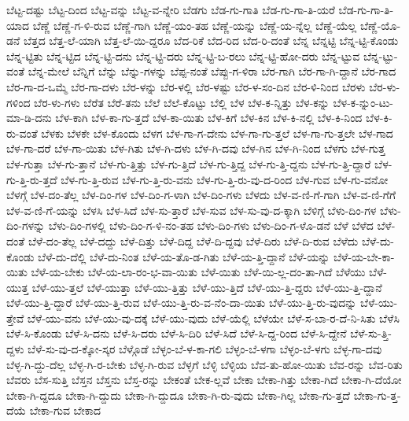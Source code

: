{ಬೆಟ್ಟ-ದಷ್ಟು
ಬೆಟ್ಟ-ದಿಂದ
ಬೆಟ್ಟ-ವನ್ನು
ಬೆಟ್ಟ-ವ-ನ್ನೇರಿ
ಬೆಡಗು
ಬೆಡ-ಗು-ಗಾತಿ
ಬೆಡ-ಗು-ಗಾ-ತಿ-ಯರೆ
ಬೆಡ-ಗು-ಗಾ-ತಿ-ಯಾದ
ಬೆಣ್ಣೆ
ಬೆಣ್ಣೆ-ಗ-ಳಿ-ರುವ
ಬೆಣ್ಣೆ-ಗಾಗಿ
ಬೆಣ್ಣೆ-ಯಂ-ತಹ
ಬೆಣ್ಣೆ-ಯನ್ನು
ಬೆಣ್ಣೆ-ಯ-ನ್ನೆಲ್ಲ
ಬೆಣ್ಣೆ-ಯೆಲ್ಲ
ಬೆಣ್ಣೆ-ಯೊ-ಡನೆ
ಬೆತ್ತದ
ಬೆತ್ತ-ಲೆ-ಯಾಗಿ
ಬೆತ್ತ-ಲೆ-ಯಿ-ದ್ದರೂ
ಬೆದ-ರಿಕೆ
ಬೆದ-ರಿದ
ಬೆದ-ರಿ-ದಂತೆ
ಬೆನ್ನ
ಬೆನ್ನಟ್ಟಿ
ಬೆನ್ನ-ಟ್ಟಿ-ಕೊಂಡು
ಬೆನ್ನ-ಟ್ಟಿತು
ಬೆನ್ನ-ಟ್ಟಿದ
ಬೆನ್ನ-ಟ್ಟಿ-ದನು
ಬೆನ್ನ-ಟ್ಟಿ-ದರು
ಬೆನ್ನ-ಟ್ಟಿ-ಬ-ರಲು
ಬೆನ್ನ-ಟ್ಟಿ-ಹೋ-ದರು
ಬೆನ್ನ-ಟ್ಟುವ
ಬೆನ್ನ-ಟ್ಟು-ವಂತೆ
ಬೆನ್ನ-ಮೇಲೆ
ಬೆನ್ನಿಗೆ
ಬೆನ್ನು
ಬೆನ್ನು-ಗಳನ್ನು
ಬೆಪ್ಪ-ನಂತೆ
ಬೆಪ್ಪು-ಗ-ಳಿರಾ
ಬೆರ-ಗಾಗಿ
ಬೆರ-ಗಾ-ಗಿ-ದ್ದಾನೆ
ಬೆರ-ಗಾದ
ಬೆರ-ಗಾ-ದ-ಒಮ್ಮೆ
ಬೆರ-ಗಾ-ದಳು
ಬೆರ-ಳನ್ನು
ಬೆರ-ಳಲ್ಲಿ
ಬೆರ-ಳಷ್ಟು
ಬೆರ-ಳ-ಸಂ-ದಿನ
ಬೆರ-ಳಿ-ನಿಂದ
ಬೆರಳು
ಬೆರ-ಳು-ಗಳಿಂದ
ಬೆರ-ಳು-ಗಳು
ಬೆರೆತ
ಬೆರೆ-ತನು
ಬೆಲೆ
ಬೆಲೆ-ಕೊಟ್ಟು
ಬೆಲ್ಲಿ
ಬೆಳ
ಬೆಳ-ಕ-ನ್ನಿತ್ತು
ಬೆಳ-ಕನ್ನು
ಬೆಳ-ಕ-ನ್ನುಂ-ಟು-ಮಾ-ಡಿ-ದನು
ಬೆಳ-ಕಾಗಿ
ಬೆಳ-ಕಾ-ಗು-ತ್ತದೆ
ಬೆಳ-ಕಾ-ಯಿತು
ಬೆಳ-ಕಿಗೆ
ಬೆಳ-ಕಿನ
ಬೆಳ-ಕಿ-ನಲ್ಲಿ
ಬೆಳ-ಕಿ-ನಿಂದ
ಬೆಳ-ಕಿ-ರು-ವಂತೆ
ಬೆಳಕು
ಬೆಳಕೇ
ಬೆಳ-ಕೊಂದು
ಬೆಳಗ
ಬೆಳ-ಗಾ-ಗ-ದೇನು
ಬೆಳ-ಗಾ-ಗು-ತ್ತಲೆ
ಬೆಳ-ಗಾ-ಗು-ತ್ತಲೇ
ಬೆಳ-ಗಾದ
ಬೆಳ-ಗಾ-ದರೆ
ಬೆಳ-ಗಾ-ಯಿತು
ಬೆಳ-ಗಿತು
ಬೆಳ-ಗಿ-ದಳು
ಬೆಳ-ಗಿ-ದವು
ಬೆಳ-ಗಿನ
ಬೆಳ-ಗಿ-ನಿಂದ
ಬೆಳಗು
ಬೆಳ-ಗುತ್ತ
ಬೆಳ-ಗುತ್ತಾ
ಬೆಳ-ಗು-ತ್ತಾನೆ
ಬೆಳ-ಗು-ತ್ತಿತ್ತು
ಬೆಳ-ಗು-ತ್ತಿದೆ
ಬೆಳ-ಗು-ತ್ತಿದ್ದ
ಬೆಳ-ಗು-ತ್ತಿ-ದ್ದನು
ಬೆಳ-ಗು-ತ್ತಿ-ದ್ದಾರೆ
ಬೆಳ-ಗು-ತ್ತಿ-ರು-ತ್ತದೆ
ಬೆಳ-ಗು-ತ್ತಿ-ರುವ
ಬೆಳ-ಗು-ತ್ತಿ-ರು-ವನು
ಬೆಳ-ಗು-ತ್ತಿ-ರು-ವು-ದ-ರಿಂದ
ಬೆಳ-ಗುವ
ಬೆಳ-ಗು-ವನೋ
ಬೆಳಗ್ಗೆ
ಬೆಳ-ದಂ-ತೆಲ್ಲ
ಬೆಳ-ದಿಂ-ಗಳ
ಬೆಳ-ದಿಂ-ಗ-ಳಾಗಿ
ಬೆಳ-ದಿಂ-ಗಳು
ಬೆಳದು
ಬೆಳ-ವ-ಣಿ-ಗೆ-ಗಾಗಿ
ಬೆಳ-ವ-ಣಿ-ಗೆಗೆ
ಬೆಳ-ವ-ಣಿ-ಗೆ-ಯನ್ನು
ಬೆಳಸಿ
ಬೆಳ-ಸಿದೆ
ಬೆಳ-ಸು-ತ್ತಾರೆ
ಬೆಳ-ಸುವ
ಬೆಳ-ಸು-ವು-ದ-ಕ್ಕಾಗಿ
ಬೆಳಿಗ್ಗೆ
ಬೆಳು-ದಿಂ-ಗಳ
ಬೆಳು-ದಿಂ-ಗಳನ್ನು
ಬೆಳು-ದಿಂ-ಗಳಲ್ಲಿ
ಬೆಳು-ದಿಂ-ಗ-ಳಿ-ನಂ-ತಹ
ಬೆಳು-ದಿಂ-ಗಳು
ಬೆಳು-ದಿಂ-ಗ-ಳೊ-ಡನೆ
ಬೆಳೆ
ಬೆಳೆದ
ಬೆಳೆ-ದಂತೆ
ಬೆಳೆ-ದಂ-ತೆಲ್ಲ
ಬೆಳೆ-ದದ್ದು
ಬೆಳೆ-ದಿತ್ತು
ಬೆಳೆ-ದಿದ್ದ
ಬೆಳೆ-ದಿ-ದ್ದವು
ಬೆಳೆ-ದಿರು
ಬೆಳೆ-ದಿ-ರುವ
ಬೆಳೆದು
ಬೆಳೆ-ದು-ಕೊಂಡು
ಬೆಳೆ-ದು-ದೆಲ್ಲಿ
ಬೆಳೆ-ದು-ನಿಂತ
ಬೆಳೆ-ಯ-ತೊ-ಡ-ಗಿತು
ಬೆಳೆ-ಯ-ತ್ತಿ-ದ್ದಾನೆ
ಬೆಳೆ-ಯನ್ನು
ಬೆಳೆ-ಯ-ಬೇ-ಕಾ-ಯಿತು
ಬೆಳೆ-ಯ-ಬೇಕು
ಬೆಳೆ-ಯ-ಲಾ-ರಂ-ಭ-ವಾ-ಯಿತು
ಬೆಳೆ-ಯಿತು
ಬೆಳೆ-ಯಿ-ಲ್ಲ-ದಂ-ತಾ-ಗಿದೆ
ಬೆಳೆಯು
ಬೆಳೆ-ಯುತ್ತ
ಬೆಳೆ-ಯು-ತ್ತಲೆ
ಬೆಳೆ-ಯುತ್ತಾ
ಬೆಳೆ-ಯು-ತ್ತಿತ್ತು
ಬೆಳೆ-ಯು-ತ್ತಿದೆ
ಬೆಳೆ-ಯು-ತ್ತಿ-ದ್ದರು
ಬೆಳೆ-ಯು-ತ್ತಿ-ದ್ದಾನೆ
ಬೆಳೆ-ಯು-ತ್ತಿ-ದ್ದಾರೆ
ಬೆಳೆ-ಯು-ತ್ತಿ-ರುವ
ಬೆಳೆ-ಯು-ತ್ತಿ-ರು-ವ-ನೆಂ-ದಾ-ಯಿತು
ಬೆಳೆ-ಯು-ತ್ತಿ-ರು-ವುದನ್ನು
ಬೆಳೆ-ಯು-ತ್ತೇವೆ
ಬೆಳೆ-ಯು-ವನು
ಬೆಳೆ-ಯು-ವು-ದಕ್ಕೆ
ಬೆಳೆ-ಯು-ವುದು
ಬೆಳೆ-ಯೆಲ್ಲಿ
ಬೆಳೆಯೇ
ಬೆಳೆ-ಸ-ಬಾ-ರ-ದೆ-ನಿ-ಸಿತು
ಬೆಳೆಸಿ
ಬೆಳೆ-ಸಿ-ಕೊಂಡು
ಬೆಳೆ-ಸಿ-ದನು
ಬೆಳೆ-ಸಿ-ದರು
ಬೆಳೆ-ಸಿ-ದಿರಿ
ಬೆಳೆ-ಸಿದೆ
ಬೆಳೆ-ಸಿ-ದ್ದ-ರಿಂದ
ಬೆಳೆ-ಸಿ-ದ್ದೇನೆ
ಬೆಳೆ-ಸು-ತ್ತಿ-ದ್ದಳು
ಬೆಳೆ-ಸು-ವು-ದ-ಕ್ಕೋ-ಸ್ಕರ
ಬೆಳ್ಗೊಡೆ
ಬೆಳ್ಳಂ-ಬೆ-ಳ-ಕಾ-ಗಲಿ
ಬೆಳ್ಳಂ-ಬೆ-ಳಗಾ
ಬೆಳ್ಳಂ-ಬೆ-ಳಗು
ಬೆಳ್ಳ-ಗಾ-ದವು
ಬೆಳ್ಳ-ಗಿ-ದ್ದು-ದೆಲ್ಲ
ಬೆಳ್ಳ-ಗಿ-ರ-ಬೇಕು
ಬೆಳ್ಳ-ಗಿ-ರುವ
ಬೆಳ್ಳಗೆ
ಬೆಳ್ಳಿ
ಬೆಳ್ಳಿಯ
ಬೆವ-ತು-ಹೋ-ಯಿತು
ಬೆವ-ರನ್ನು
ಬೆವ-ರಿತು
ಬೆವರು
ಬೆಸ-ಸುತ್ತಿ
ಬೆಸ್ತನ
ಬೆಸ್ತನು
ಬೆಸ್ತ-ರನ್ನು
ಬೇಕಂತೆ
ಬೇಕ-ಲ್ಲವೆ
ಬೇಕಾ
ಬೇಕಾ-ಗಿತ್ತು
ಬೇಕಾ-ಗಿದೆ
ಬೇಕಾ-ಗಿ-ದೆಯೋ
ಬೇಕಾ-ಗಿ-ದ್ದದೂ
ಬೇಕಾ-ಗಿ-ದ್ದುದು
ಬೇಕಾ-ಗಿ-ದ್ದುದೂ
ಬೇಕಾ-ಗಿ-ರು-ವುದು
ಬೇಕಾ-ಗಿಲ್ಲ
ಬೇಕಾ-ಗು-ತ್ತದೆ
ಬೇಕಾ-ಗು-ತ್ತ-ದೆಯೆ
ಬೇಕಾ-ಗುವ
ಬೇಕಾದ
}
